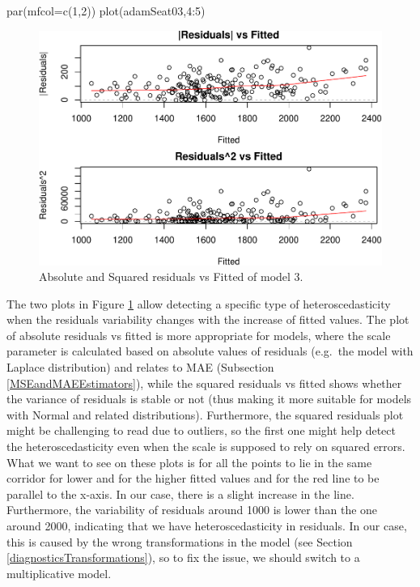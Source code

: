 \documentclass[
]{book}
\newenvironment{Shaded}{\begin{snugshade}}{\end{snugshade}}
\newcommand{\AttributeTok}[1]{\textcolor[rgb]{0.77,0.63,0.00}{#1}}
\newcommand{\DecValTok}[1]{\textcolor[rgb]{0.00,0.00,0.81}{#1}}
\newcommand{\FunctionTok}[1]{\textcolor[rgb]{0.00,0.00,0.00}{#1}}
\newcommand{\NormalTok}[1]{#1}
\newcommand{\SpecialCharTok}[1]{\textcolor[rgb]{0.00,0.00,0.00}{#1}}
\theoremstyle{definition}
\theoremstyle{definition}
\theoremstyle{definition}
\theoremstyle{definition}
\theoremstyle{remark}
\begin{document}
\begin{Shaded}
\begin{Highlighting}[]
\FunctionTok{par}\NormalTok{(}\AttributeTok{mfcol=}\FunctionTok{c}\NormalTok{(}\DecValTok{1}\NormalTok{,}\DecValTok{2}\NormalTok{))}
\FunctionTok{plot}\NormalTok{(adamSeat03,}\DecValTok{4}\SpecialCharTok{:}\DecValTok{5}\NormalTok{)}
\end{Highlighting}
\end{Shaded}

\begin{figure}
\centering
\includegraphics{Svetunkov--2022----ADAM_files/figure-latex/adamSeat03Hetero-1.pdf}
\caption{\label{fig:adamSeat03Hetero}Absolute and Squared residuals vs Fitted of model 3.}
\end{figure}

The two plots in Figure \ref{fig:adamSeat03Hetero} allow detecting a specific type of heteroscedasticity when the residuals variability changes with the increase of fitted values. The plot of absolute residuals vs fitted is more appropriate for models, where the scale parameter is calculated based on absolute values of residuals (e.g.~the model with Laplace distribution) and relates to MAE (Subsection \ref{MSEandMAEEstimators}), while the squared residuals vs fitted shows whether the variance of residuals is stable or not (thus making it more suitable for models with Normal and related distributions). Furthermore, the squared residuals plot might be challenging to read due to outliers, so the first one might help detect the heteroscedasticity even when the scale is supposed to rely on squared errors. What we want to see on these plots is for all the points to lie in the same corridor for lower and for the higher fitted values and for the red line to be parallel to the x-axis. In our case, there is a slight increase in the line. Furthermore, the variability of residuals around 1000 is lower than the one around 2000, indicating that we have heteroscedasticity in residuals. In our case, this is caused by the wrong transformations in the model (see Section \ref{diagnosticsTransformations}), so to fix the issue, we should switch to a multiplicative model.
\end{document}
